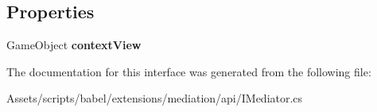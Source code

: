 \subsection*{Properties}
\begin{DoxyCompactItemize}
\item 
\hypertarget{interfacebabel_1_1extensions_1_1mediation_1_1api_1_1_i_mediator_aa756b8e8e3e8ba1807a43cb9439aa737}{Game\-Object {\bfseries context\-View}}\label{interfacebabel_1_1extensions_1_1mediation_1_1api_1_1_i_mediator_aa756b8e8e3e8ba1807a43cb9439aa737}

\end{DoxyCompactItemize}


The documentation for this interface was generated from the following file\-:\begin{DoxyCompactItemize}
\item 
Assets/scripts/babel/extensions/mediation/api/I\-Mediator.\-cs\end{DoxyCompactItemize}

